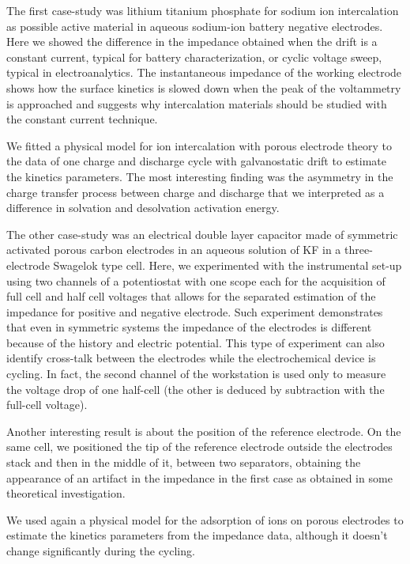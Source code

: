 The first case-study was lithium titanium phosphate for sodium ion intercalation as possible active material in aqueous sodium-ion battery negative electrodes. Here we showed the difference in the impedance obtained when the drift is a constant current, typical for battery characterization, or cyclic voltage sweep, typical in electroanalytics. The instantaneous impedance of the working electrode shows how the surface kinetics is slowed down when the peak of the voltammetry is approached and suggests why intercalation materials should be studied with the constant current technique. 

We fitted a physical model for ion intercalation with porous electrode theory to the data of one charge and discharge cycle with galvanostatic drift to estimate the kinetics parameters. The most interesting finding was the asymmetry in the charge transfer process between charge and discharge that we interpreted as a difference in solvation and desolvation activation energy. 

The other case-study was an electrical double layer capacitor made of symmetric activated porous carbon electrodes in an aqueous solution of KF in a three-electrode Swagelok type cell. Here, we experimented with the instrumental set-up using two channels of a potentiostat with one scope each for the acquisition of full cell and half cell voltages that allows for the separated estimation of the impedance for positive and negative electrode. Such experiment demonstrates that even in symmetric systems the impedance of the electrodes is different because of the history and electric potential. This type of experiment can also identify cross-talk between the electrodes while the electrochemical device is cycling. In fact, the second channel of the workstation is used only to measure the voltage drop of one half-cell (the other is deduced by subtraction with the full-cell voltage).

Another interesting result is about the position of the reference electrode. On the same cell, we positioned the tip of the reference electrode outside the electrodes stack and then in the middle of it, between two separators, obtaining the appearance of an artifact in the impedance in the first case as obtained in some theoretical investigation.

We used again a physical model for the adsorption of ions on porous electrodes to estimate the kinetics parameters from the impedance data, although it doesn't change significantly during the cycling.

